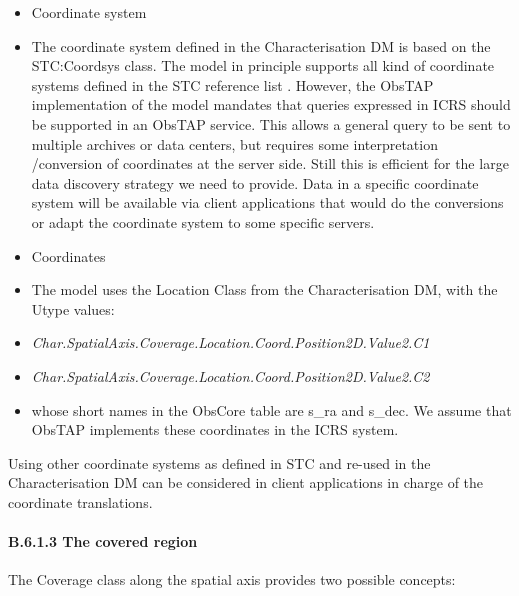 \documentclass[11pt,a4paper]{ivoa}
\begin{document}
\begin{itemize}
\item Coordinate system
\item[ ] The coordinate system defined in the Characterisation DM is based on the STC:Coordsys class.  The model in principle
supports all kind of coordinate systems defined in the STC reference list \citep{2009ivoa.rept.1030R}. However, the ObsTAP
implementation of the model mandates that queries expressed in ICRS should be supported in an ObsTAP service. This
allows a general query to be sent to multiple archives or data centers, but requires some interpretation /conversion of
coordinates at the server side. Still this is efficient for the large data discovery strategy we need to provide.  Data
in a specific coordinate system will be available via client applications that would do the conversions or adapt the
coordinate system to some specific servers.

\item Coordinates

\item[ ] The model uses the Location Class from the Characterisation DM, with the Utype values:

\item[ ] \emph{Char.SpatialAxis.Coverage.Location.Coord.Position2D.Value2.C1}

\item[ ] \emph{Char.SpatialAxis.Coverage.Location.Coord.Position2D.Value2.C2}

\item[ ] whose short names in the ObsCore table are s\_ra and s\_dec. We assume that ObsTAP implements these coordinates in the
ICRS system.
\end{itemize}

Using other coordinate systems as defined in STC \citep{2009ivoa.rept.1030R} and re-used in the Characterisation DM can be
considered in client applications in charge of the coordinate translations.

\paragraph{B.6.1.3 The covered region}
The Coverage class along the spatial axis provides two possible concepts:
\end{document}
